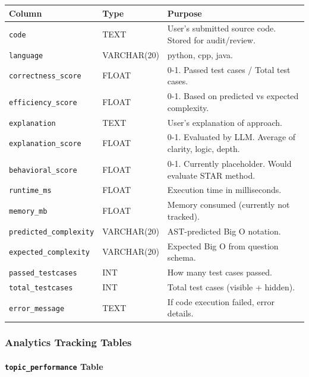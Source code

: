 \documentclass[12pt,a4paper,oneside]{article}
\newcommand{\varname}[1]{\texttt{#1}}
\newcommand{\database}[1]{\texttt{#1}}
\begin{document}
\begin{table}[H]
\centering
\small
\begin{tabular}{|p{2.3cm}|p{1.8cm}|p{9.9cm}|}
\hline
\textbf{Column} & \textbf{Type} & \textbf{Purpose} \\
\hline
\varname{code} & TEXT & User's submitted source code. Stored for audit/review. \\
\hline
\varname{language} & VARCHAR(20) & python, cpp, java. \\
\hline
\varname{correctness\_score} & FLOAT & 0-1. Passed test cases / Total test cases. \\
\hline
\varname{efficiency\_score} & FLOAT & 0-1. Based on predicted vs expected complexity. \\
\hline
\varname{explanation} & TEXT & User's explanation of approach. \\
\hline
\varname{explanation\_score} & FLOAT & 0-1. Evaluated by LLM. Average of clarity, logic, depth. \\
\hline
\varname{behavioral\_score} & FLOAT & 0-1. Currently placeholder. Would evaluate STAR method. \\
\hline
\varname{runtime\_ms} & FLOAT & Execution time in milliseconds. \\
\hline
\varname{memory\_mb} & FLOAT & Memory consumed (currently not tracked). \\
\hline
\varname{predicted\_complexity} & VARCHAR(20) & AST-predicted Big O notation. \\
\hline
\varname{expected\_complexity} & VARCHAR(20) & Expected Big O from question schema. \\
\hline
\varname{passed\_testcases} & INT & How many test cases passed. \\
\hline
\varname{total\_testcases} & INT & Total test cases (visible + hidden). \\
\hline
\varname{error\_message} & TEXT & If code execution failed, error details. \\
\hline
\end{tabular}
\end{table}

\subsubsection{Analytics Tracking Tables}

\paragraph{\database{topic\_performance} Table}
\end{document}
